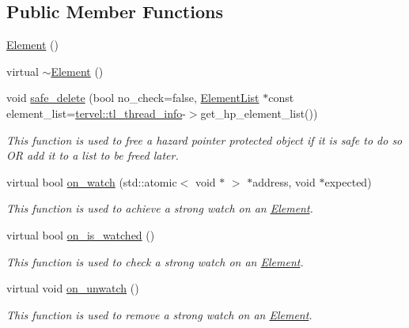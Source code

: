 \subsection*{Public Member Functions}
\begin{DoxyCompactItemize}
\item 
\hyperlink{classtervel_1_1util_1_1memory_1_1hp_1_1_element_a9b14f67c07b2bd0081978697bf7e545f}{Element} ()
\item 
virtual \hyperlink{classtervel_1_1util_1_1memory_1_1hp_1_1_element_abe65a1233e6d95b0a75c2ca3383daa86}{$\sim$\+Element} ()
\item 
void \hyperlink{classtervel_1_1util_1_1memory_1_1hp_1_1_element_af2356f697bc41aeffdc4a3e8f9aacefc}{safe\+\_\+delete} (bool no\+\_\+check=false, \hyperlink{classtervel_1_1util_1_1memory_1_1hp_1_1_element_list}{Element\+List} $\ast$const element\+\_\+list=\hyperlink{namespacetervel_a60b23602adbb2dee6160af411b74bfd3}{tervel\+::tl\+\_\+thread\+\_\+info}-\/$>$get\+\_\+hp\+\_\+element\+\_\+list())
\begin{DoxyCompactList}\small\item\em This function is used to free a hazard pointer protected object if it is safe to do so O\+R add it to a list to be freed later. \end{DoxyCompactList}\item 
virtual bool \hyperlink{classtervel_1_1util_1_1memory_1_1hp_1_1_element_a53493ef4754dd77016139863af964f90}{on\+\_\+watch} (std\+::atomic$<$ void $\ast$ $>$ $\ast$address, void $\ast$expected)
\begin{DoxyCompactList}\small\item\em This function is used to achieve a strong watch on an \hyperlink{classtervel_1_1util_1_1memory_1_1hp_1_1_element}{Element}. \end{DoxyCompactList}\item 
virtual bool \hyperlink{classtervel_1_1util_1_1memory_1_1hp_1_1_element_a88306bc6b64d0110e3ee568514dbcc04}{on\+\_\+is\+\_\+watched} ()
\begin{DoxyCompactList}\small\item\em This function is used to check a strong watch on an \hyperlink{classtervel_1_1util_1_1memory_1_1hp_1_1_element}{Element}. \end{DoxyCompactList}\item 
virtual void \hyperlink{classtervel_1_1util_1_1memory_1_1hp_1_1_element_ae71f306b6c9f08565e61546a0dc0a30c}{on\+\_\+unwatch} ()
\begin{DoxyCompactList}\small\item\em This function is used to remove a strong watch on an \hyperlink{classtervel_1_1util_1_1memory_1_1hp_1_1_element}{Element}. \end{DoxyCompactList}\end{DoxyCompactItemize}
